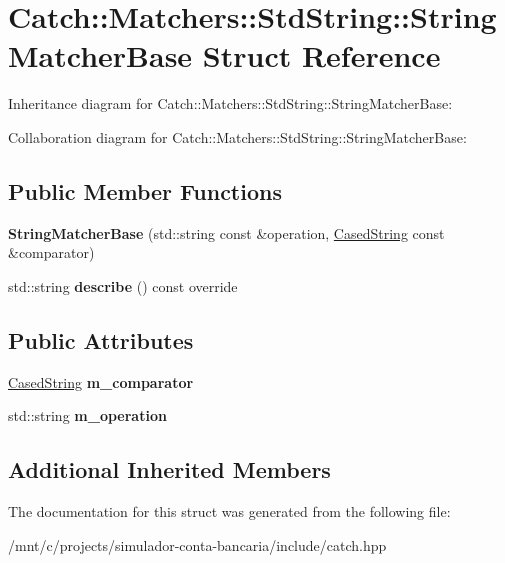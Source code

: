 \hypertarget{structCatch_1_1Matchers_1_1StdString_1_1StringMatcherBase}{}\section{Catch\+:\+:Matchers\+:\+:Std\+String\+:\+:String\+Matcher\+Base Struct Reference}
\label{structCatch_1_1Matchers_1_1StdString_1_1StringMatcherBase}


Inheritance diagram for Catch\+:\+:Matchers\+:\+:Std\+String\+:\+:String\+Matcher\+Base\+:


Collaboration diagram for Catch\+:\+:Matchers\+:\+:Std\+String\+:\+:String\+Matcher\+Base\+:
\subsection*{Public Member Functions}
\begin{DoxyCompactItemize}
\item 
\mbox{\label{structCatch_1_1Matchers_1_1StdString_1_1StringMatcherBase_a3a9b66bae298ae27058478529b4bb39d}} 
{\bfseries String\+Matcher\+Base} (std\+::string const \&operation, \hyperlink{structCatch_1_1Matchers_1_1StdString_1_1CasedString}{Cased\+String} const \&comparator)
\item 
\mbox{\label{structCatch_1_1Matchers_1_1StdString_1_1StringMatcherBase_a47af030f8cea42a601ffb1000eea5cca}} 
std\+::string {\bfseries describe} () const override
\end{DoxyCompactItemize}
\subsection*{Public Attributes}
\begin{DoxyCompactItemize}
\item 
\mbox{\label{structCatch_1_1Matchers_1_1StdString_1_1StringMatcherBase_a17c9f0fe40587070ffe998c193742831}} 
\hyperlink{structCatch_1_1Matchers_1_1StdString_1_1CasedString}{Cased\+String} {\bfseries m\+\_\+comparator}
\item 
\mbox{\label{structCatch_1_1Matchers_1_1StdString_1_1StringMatcherBase_a7a25c4b7d863e9a1c406d81efd0f83ca}} 
std\+::string {\bfseries m\+\_\+operation}
\end{DoxyCompactItemize}
\subsection*{Additional Inherited Members}


The documentation for this struct was generated from the following file\+:\begin{DoxyCompactItemize}
\item 
/mnt/c/projects/simulador-\/conta-\/bancaria/include/catch.\+hpp\end{DoxyCompactItemize}
